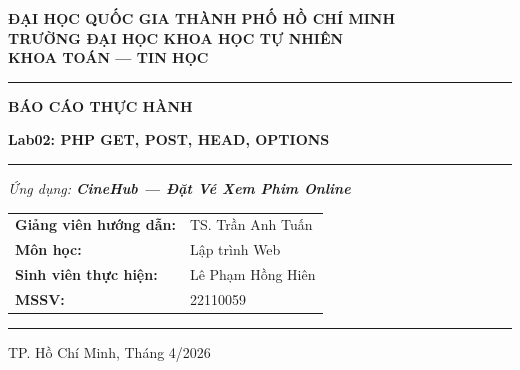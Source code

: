 \documentclass[12pt,a4paper]{article}
\begin{document}
\begin{titlepage}

\begin{center}

\vspace*{0.5cm}

{\fontsize{14}{16}\selectfont \textbf{ĐẠI HỌC QUỐC GIA THÀNH PHỐ HỒ CHÍ MINH}}\\[4pt]
{\fontsize{14}{16}\selectfont \textbf{TRƯỜNG ĐẠI HỌC KHOA HỌC TỰ NHIÊN}}\\[4pt]
{\fontsize{13}{15}\selectfont \textbf{KHOA TOÁN --- TIN HỌC}}

\vspace{6pt}
{\color{blue!70!black}\rule{8cm}{1.5pt}}

\vspace{2.5cm}

{\fontsize{24}{28}\selectfont \textbf{BÁO CÁO THỰC HÀNH}}

\vspace{10pt}

{\fontsize{16}{20}\selectfont \textbf{Lab02: PHP GET, POST, HEAD, OPTIONS}}

\vspace{15pt}

{\color{blue!70!black}\rule{6cm}{0.8pt}}

\vspace{15pt}

{\fontsize{14}{17}\selectfont \textit{Ứng dụng: \textbf{CineHub — Đặt Vé Xem Phim Online}}}

\vspace{3cm}

\begin{tabular}{ll}
    \textbf{Giảng viên hướng dẫn:} & TS. Trần Anh Tuấn \\[4pt]
    \textbf{Môn học:} & Lập trình Web \\[4pt]
    \textbf{Sinh viên thực hiện:} & Lê Phạm Hồng Hiên \\[4pt]
    \textbf{MSSV:} & 22110059 \\[4pt]
\end{tabular}

\vfill

{\color{blue!70!black}\rule{5cm}{0.8pt}}

\vspace{6pt}

{\large TP. Hồ Chí Minh, Tháng 4/2026}

\end{center}
\end{titlepage}
\end{document}
